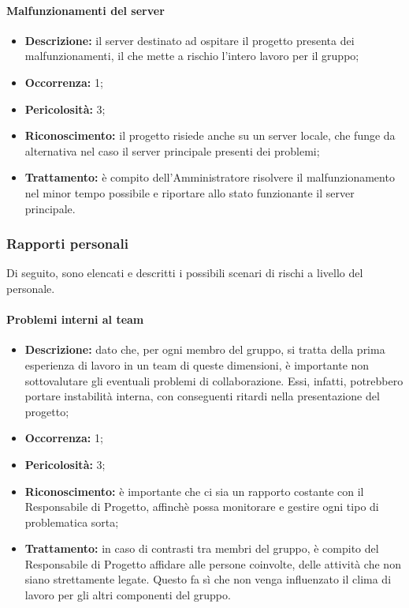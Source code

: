 \paragraph{Malfunzionamenti del server}
\begin{itemize}
	\item \textbf{Descrizione:} il server destinato ad ospitare il progetto presenta dei malfunzionamenti, il che mette a rischio l'intero lavoro per il gruppo;
	\item \textbf{Occorrenza:} 1;
	\item \textbf{Pericolosità:} 3;
	\item \textbf{Riconoscimento:} il progetto risiede anche su un server locale, che funge da alternativa nel caso il server principale presenti dei problemi;
	\item \textbf{Trattamento:} è compito dell'Amministratore risolvere il malfunzionamento nel minor tempo possibile e riportare allo stato funzionante il server principale.
\end{itemize}

\subsubsection{Rapporti personali}

Di seguito, sono elencati e descritti i possibili scenari di rischi a livello del personale.

\paragraph{Problemi interni al team}
\begin{itemize}
	\item \textbf{Descrizione:} dato che, per ogni membro del gruppo, si tratta della prima esperienza di lavoro in un team di queste dimensioni, è importante non sottovalutare gli eventuali problemi di collaborazione. Essi, infatti, potrebbero portare instabilità interna, con conseguenti ritardi nella presentazione del progetto;
	\item \textbf{Occorrenza:} 1;
	\item \textbf{Pericolosità:} 3;
	\item \textbf{Riconoscimento:} è importante che ci sia un rapporto costante con il Responsabile di Progetto, affinchè possa monitorare e gestire ogni tipo di problematica sorta;
	\item \textbf{Trattamento:} in caso di contrasti tra membri del gruppo, è compito del Responsabile di Progetto affidare alle persone coinvolte, delle attività che non siano strettamente legate. Questo fa sì che non venga influenzato il clima di lavoro per gli altri componenti del gruppo.
\end{itemize}

